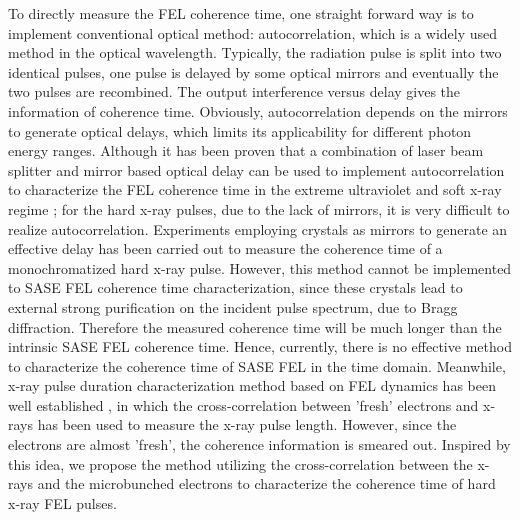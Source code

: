 \documentclass[%
 preprint,
 amsmath,amssymb,
 aps,
 prl,
 superscriptaddress,
 floatfix,
 letter,
]{revtex4-1}
\begin{document}
To directly measure the FEL coherence time, one straight forward way is to implement conventional optical method: autocorrelation, which is a widely used method in the optical wavelength. Typically, the radiation pulse is split into two identical pulses, one pulse is delayed by some optical mirrors and eventually the two pulses are recombined. The output interference versus delay gives the information of coherence time. Obviously, autocorrelation depends on the mirrors to generate optical delays, which limits its applicability for different photon energy ranges. Although it has been proven that a combination of laser beam splitter and mirror based optical delay can be used to implement autocorrelation to characterize the FEL coherence time in the extreme ultraviolet and soft x-ray regime \cite*{autocorrelation_EUV,SXRAY_autocorrelation}; for the hard x-ray pulses, due to the lack of mirrors, it is very difficult to realize autocorrelation. Experiments employing crystals as mirrors to generate an effective delay has been carried out to measure the coherence time of a monochromatized hard x-ray pulse\cite{HXray_autocorrelation}. However, this method cannot be implemented to SASE FEL coherence time characterization, since these crystals lead to external strong purification on the incident pulse spectrum, due to Bragg diffraction. Therefore the measured coherence time will be much longer than the intrinsic SASE FEL coherence time. Hence, currently, there is no effective method to characterize the coherence time of SASE FEL in the time domain. Meanwhile, x-ray pulse duration characterization method based on FEL dynamics has been well established \cite*{gelonifresh,ding2012}, in which the cross-correlation between 'fresh' electrons and x-rays has been used to measure the x-ray pulse length. However, since the electrons are almost 'fresh', the coherence information is smeared out. Inspired by this idea, we propose the method utilizing the cross-correlation between the x-rays and the microbunched electrons to characterize the coherence time of hard x-ray FEL pulses.
\end{document}
